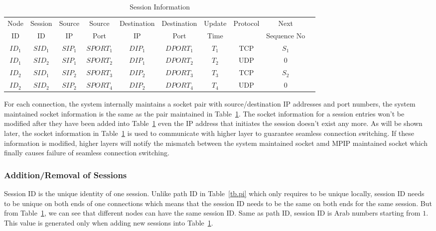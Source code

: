 \begin{table}
\caption{\label{tb.ss}Session Information}
\centering
\begin{tabular}{|c|c|c|c|c|c|c|c|c|c|}
\hline
Node  & Session &  Source &  Source & Destination & Destination & Update  & Protocol  &    Next      \\
  ID  &   ID    &    IP   &   Port  &     IP      &    Port     &  Time   &           &  Sequence No \\
\hline
${ID}_1$&${SID}_1$&${SIP}_{1}$&${SPORT}_{1}$&${DIP}_{1}$&${DPORT}_{1}$&$T_1$&TCP&$S_1$               \\
\hline
${ID}_1$&${SID}_2$&${SIP}_{1}$&${SPORT}_{2}$&${DIP}_{1}$&${DPORT}_{2}$&$T_2$&UDP&$0$                 \\
\hline
${ID}_2$&${SID}_1$&${SIP}_{2}$&${SPORT}_{3}$&${DIP}_{2}$&${DPORT}_{3}$&$T_3$&TCP&$S_2$              \\
\hline
${ID}_2$&${SID}_2$&${SIP}_{2}$&${SPORT}_{4}$&${DIP}_{2}$&${DPORT}_{4}$&$T_4$&UDP&$0$                 \\
\hline
\end{tabular}
\end{table}

For each connection, the system internally maintains a socket pair with source/destination IP addresses and port numbers, the system maintained socket information is the same as the pair maintained in Table~\ref{tb.ss}. The socket information for a session entries won't be modified after they have been added into Table~\ref{tb.ss} even the IP address that initiates the session doesn't exist any more. As will be shown later, the socket information in Table~\ref{tb.ss} is used to communicate with higher layer to guarantee seamless connection switching. If these information is modified, higher layers will notify the mismatch between the system maintained socket amd MPIP maintained socket which finally causes failure of seamless connection switching.

\subsubsection{Addition/Removal of Sessions}

Session ID is the unique identity of one session. Unlike path ID in Table~\ref{tb.pi} which only requires to be unique locally, session ID needs to be unique on both ends of one connections which means that the session ID needs to be the same on both ends for the same session. But from Table~\ref{tb.ss}, we can see that different nodes can have the same session ID. Same as path ID, session ID is Arab numbers starting from $1$. This value is generated only when adding new sessions into Table~\ref{tb.ss}.

